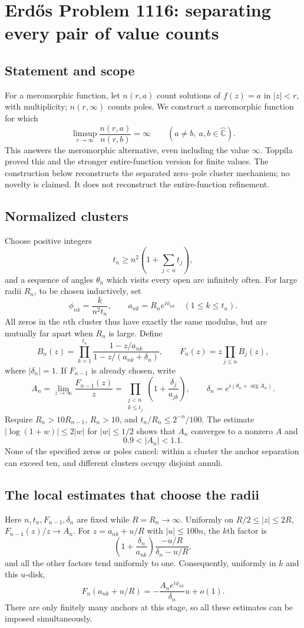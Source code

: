 \section*{Erd\H{o}s Problem 1116: separating every pair of value counts}
\subsection*{Statement and scope}
For a meromorphic function, let $n(r,a)$ count solutions of $f(z)=a$ in $|z|<r$, with multiplicity; $n(r,\infty)$ counts poles. We construct a meromorphic function for which
\[
 \limsup_{r\to\infty}\frac{n(r,a)}{n(r,b)}=\infty
 \qquad(a\ne b,\ a,b\in\widehat{\mathbb C}).
\]
This answers the meromorphic alternative, even including the value $\infty$. Toppila proved this and the stronger entire-function version for finite values. The construction below reconstructs the separated zero--pole cluster mechanism; no novelty is claimed. It does not reconstruct the entire-function refinement.

\subsection*{Normalized clusters}
Choose positive integers
\[
 t_n\ge n^2\left(1+\sum_{j<n}t_j\right),
\]
and a sequence of angles $\theta_n$ which visits every open arc infinitely often. For large radii $R_n$, to be chosen inductively, set
\[
 \phi_{nk}=\frac{k}{n^2t_n},\qquad
 a_{nk}=R_ne^{i\phi_{nk}}\quad(1\le k\le t_n).
\]
All zeros in the $n$th cluster thus have exactly the same modulus, but are mutually far apart when $R_n$ is large. Define
\[
 B_n(z)=\prod_{k=1}^{t_n}
 \frac{1-z/a_{nk}}{1-z/(a_{nk}+\delta_n)},\qquad
 F_n(z)=z\prod_{j\le n}B_j(z),
\]
where $|\delta_n|=1$. If $F_{n-1}$ is already chosen, write
\[
 A_n=\lim_{z\to\infty}\frac{F_{n-1}(z)}z
     =\prod_{\substack{j<n\\k\le t_j}}\left(1+\frac{\delta_j}{a_{jk}}\right),
 \qquad
 \delta_n=e^{i(\theta_n+\arg A_n)}.
\]
Require $R_n>10R_{n-1}$, $R_n>10$, and $t_n/R_n\le2^{-n}/100$.
The estimate $|\log(1+w)|\le2|w|$ for $|w|\le1/2$ shows that $A_n$ converges to a nonzero $A$ and
\[
 0.9<|A_n|<1.1.
 \tag{1}
\]
None of the specified zeros or poles cancel: within a cluster the anchor separation can exceed ten, and different clusters occupy disjoint annuli.

\subsection*{The local estimates that choose the radii}
Here $n,t_n,F_{n-1},\delta_n$ are fixed while $R=R_n\to\infty$. Uniformly on $R/2\le|z|\le2R$,
$F_{n-1}(z)/z\to A_n$.
For $z=a_{nk}+u/R$ with $|u|\le100n$, the $k$th factor is
\[
 \left(1+\frac{\delta_n}{a_{nk}}\right)
 \frac{-u/R}{\delta_n-u/R},
\]
and all the other factors tend uniformly to one. Consequently, uniformly in $k$ and this $u$-disk,
\[
 F_n(a_{nk}+u/R)
   =-\frac{A_ne^{i\phi_{nk}}}{\delta_n}u+o(1).
 \tag{2}
\]
There are only finitely many anchors at this stage, so all these estimates can be imposed simultaneously.


